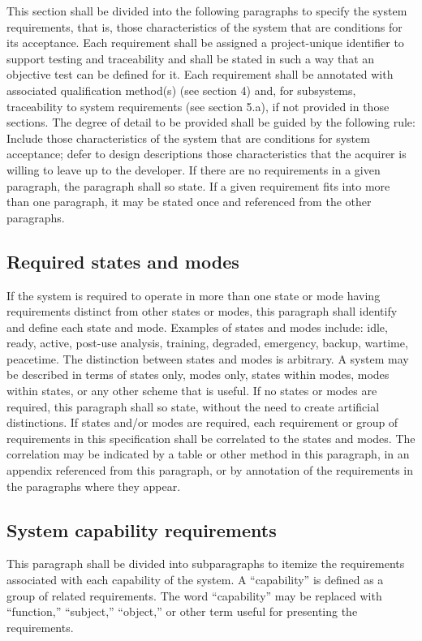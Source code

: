 This section shall be divided into the following paragraphs to specify
the system requirements, that is, those characteristics of the system
that are conditions for its acceptance. Each requirement shall be
assigned a project-unique identifier to support testing and traceability
and shall be stated in such a way that an objective test can be defined
for it. Each requirement shall be annotated with associated
qualification method(s) (see section 4) and, for subsystems,
traceability to system requirements (see section 5.a), if not provided
in those sections. The degree of detail to be provided shall be guided
by the following rule: Include those characteristics of the system that
are conditions for system acceptance; defer to design descriptions those
characteristics that the acquirer is willing to leave up to the
developer. If there are no requirements in a given paragraph, the
paragraph shall so state. If a given requirement fits into more than one
paragraph, it may be stated once and referenced from the other
paragraphs.

\subsection{Required states and modes}

If the system is required to operate in more than one state or mode
having requirements distinct from other states or modes, this paragraph
shall identify and define each state and mode. Examples of states and
modes include: idle, ready, active, post-use analysis, training,
degraded, emergency, backup, wartime, peacetime. The distinction between
states and modes is arbitrary. A system may be described in terms of
states only, modes only, states within modes, modes within states, or
any other scheme that is useful. If no states or modes are required,
this paragraph shall so state, without the need to create artificial
distinctions. If states and/or modes are required, each requirement or
group of requirements in this specification shall be correlated to the
states and modes. The correlation may be indicated by a table or other
method in this paragraph, in an appendix referenced from this paragraph,
or by annotation of the requirements in the paragraphs where they
appear.

\subsection{System capability requirements}

This paragraph shall be divided into subparagraphs to itemize the
requirements associated with each capability of the system. A
``capability'' is defined as a group of related requirements. The word
``capability'' may be replaced with ``function,'' ``subject,''
``object,'' or other term useful for presenting the requirements.

